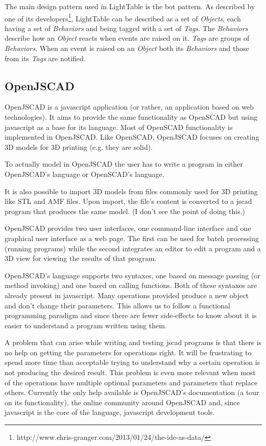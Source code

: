 \documentclass{./llncs2e/llncs}
\begin{document}
	The main design pattern used in LightTable is the \ac{bot} pattern. 
	As described by one of its developers\footnote{http://www.chris-granger.com/2013/01/24/the-ide-as-data/}, LightTable can be described as a set of \emph{Objects}, each having a set of \emph{Behaviors} and being tagged with a set of \emph{Tags}. 
	The \emph{Behaviors} describe how an \emph{Object} reacts when events are raised on it. \emph{Tags} are groups of \emph{Behaviors}. 
	When an event is raised on an \emph{Object} both its \emph{Behaviors} and those from its \emph{Tags} are notified.

\subsection{OpenJSCAD}
	OpenJSCAD is a javascript application (or rather, an application based on web technologies).
	It aims to provide the same functionality as OpenSCAD but using javascript as a base for its language. 
	Most of OpenSCAD functionality is implemented in OpenJSCAD. 
	Like OpenSCAD, OpenJSCAD focuses on creating 3D models for 3D printing (e.g. they are solid).

	To actually model in OpenJSCAD the user has to write a program in either OpenJSCAD's language or OpenSCAD's language.

	It is also possible to import 3D models from files commonly used for 3D printing like STL and AMF files.
	Upon import, the file's content is converted to a jscad program that produces the same model. (I don't see the point of doing this.)

	OpenJSCAD provides two user interfaces, one command-line interface and one graphical user interface as a web page.
	The first can be used for batch processing (running programs) while the second integrates an editor to edit a program and a 3D view for viewing the results of that program.

	OpenJSCAD's language supports two syntaxes, one based on message passing (or method invoking) and one based on calling functions.
	Both of these syntaxes are already present in javascript. 
	Many operations provided produce a new object and don't change their parameters. 
	This allows us to follow a functional programming paradigm and since there are fewer side-effects to know about it is easier to understand a program written using them.

	A problem that can arise while writing and testing jscad programs is that there is no help on getting the parameters for operations right.
	It will be frustrating to spend more time than acceptable trying to understand why a certain operation is not producing the desired result. 
	This problem is even more relevant when most of the operations have multiple optional parameters and parameters that replace others. 
	Currently the only help available is OpenJSCAD's documentation (a tour on its functionality), the online community around OpenJSCAD and, since javascript is the core of the language, javascript development tools.
\end{document}
